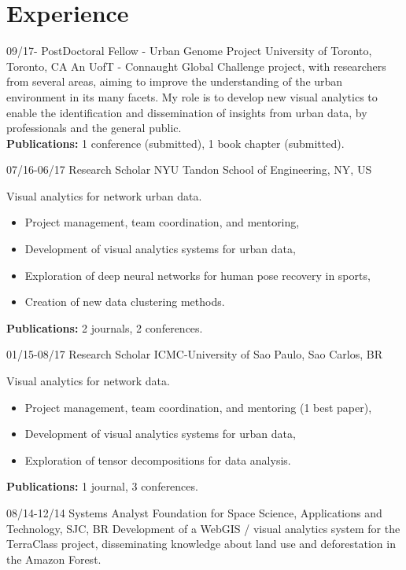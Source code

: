 \documentclass[]{friggeri-cv}
\begin{document}
\section{Experience}
\begin{entrylist}
  \entry
  {09/17- }
  {PostDoctoral Fellow - Urban Genome Project}
  {University of Toronto, Toronto, CA}
  { An UofT - Connaught Global Challenge project, with 
    researchers from several areas, aiming to improve the 
    understanding of the urban environment in its many facets.
    My role is to develop new visual analytics to
    enable the identification and dissemination of insights 
    from urban data, by professionals and the general public. \\
    \textbf{Publications:} 1 conference (submitted), 1 book chapter (submitted).\\
  }

  \entry
      {07/16-06/17}
      {Research Scholar}
      {NYU Tandon School of Engineering, NY, US}
      {Visual analytics for network urban data.
        \begin{itemize}
          \item{Project management, team coordination, and mentoring,}
          \item{Development of visual analytics systems for urban data,}
          \item{Exploration of deep neural networks for human pose recovery in sports,}
          \item{Creation of new data clustering methods.}
        \end{itemize}
        \textbf{Publications:} 2 journals, 2 conferences.
      }
      
  \entry
      {01/15-08/17}
      {Research Scholar}
      {ICMC-University of Sao Paulo, Sao Carlos, BR}
      { Visual analytics for network data.
        \begin{itemize}
          \item{Project management, team coordination, and mentoring (1 best paper),}
          \item{Development of visual analytics systems for urban data,}
          \item{Exploration of tensor decompositions for data analysis.}
        \end{itemize}
        \textbf{Publications:} 1 journal, 3 conferences.
      }
      
  \entry
      {08/14-12/14}
      {Systems Analyst}
      {Foundation for Space Science, Applications and Technology, SJC, BR}
      { Development of a WebGIS / visual analytics system for the TerraClass 
        project, disseminating knowledge about land use and deforestation in 
        the Amazon Forest.
      }
      

\end{entrylist}
\end{document}
